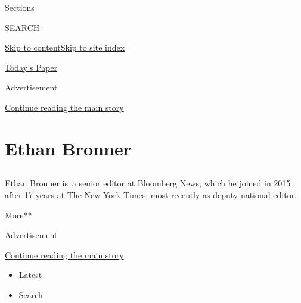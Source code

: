 Sections

SEARCH

\protect\hyperlink{site-content}{Skip to
content}\protect\hyperlink{site-index}{Skip to site index}

\href{https://myaccount.nytimes.com/auth/login?response_type=cookie\&client_id=vi}{}

\href{https://www.nytimes.com/section/todayspaper}{Today's Paper}

Advertisement

\protect\hyperlink{after-top}{Continue reading the main story}

\hypertarget{ethan-bronner}{%
\section{Ethan Bronner}\label{ethan-bronner}}

\hypertarget{section}{%
\subsection{}\label{section}}

Ethan Bronner is~a senior editor at Bloomberg News, which he joined in
2015 after 17 years at The New York Times, most recently as deputy
national editor.~

More**

Advertisement

\protect\hyperlink{after-mid1}{Continue reading the main story}

\begin{itemize}
\tightlist
\item
  \protect\hyperlink{stream-panel}{Latest}
\item
  Search
\end{itemize}

